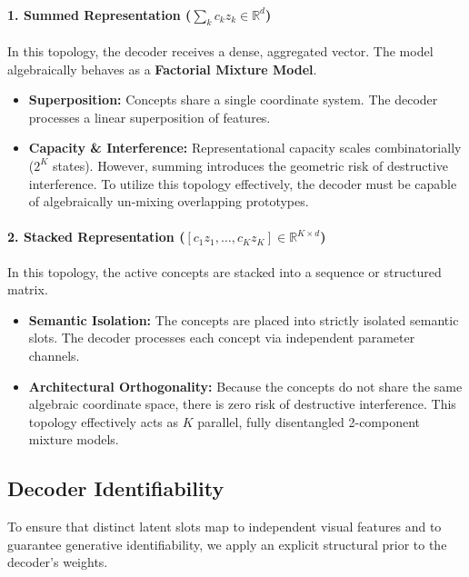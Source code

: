 \documentclass[11pt, a4paper]{article}
\begin{document}
\paragraph{1. Summed Representation ($\sum_{k} c_k z_k \in \mathbb{R}^d$)}
In this topology, the decoder receives a dense, aggregated vector. The model algebraically behaves as a \textbf{Factorial Mixture Model}. 
\begin{itemize}
    \item \textbf{Superposition:} Concepts share a single coordinate system. The decoder processes a linear superposition of features.
    \item \textbf{Capacity \& Interference:} Representational capacity scales combinatorially ($2^K$ states). However, summing introduces the geometric risk of destructive interference. To utilize this topology effectively, the decoder must be capable of algebraically un-mixing overlapping prototypes.
\end{itemize}

\paragraph{2. Stacked Representation ($[c_1 z_1, \dots, c_K z_K] \in \mathbb{R}^{K \times d}$)}
In this topology, the active concepts are stacked into a sequence or structured matrix. 
\begin{itemize}
    \item \textbf{Semantic Isolation:} The concepts are placed into strictly isolated semantic slots. The decoder processes each concept via independent parameter channels.
    \item \textbf{Architectural Orthogonality:} Because the concepts do not share the same algebraic coordinate space, there is zero risk of destructive interference. This topology effectively acts as $K$ parallel, fully disentangled 2-component mixture models.
\end{itemize}

\subsection{Decoder Identifiability}

To ensure that distinct latent slots map to independent visual features and to guarantee generative identifiability, we apply an explicit structural prior to the decoder's weights. 
\end{document}
